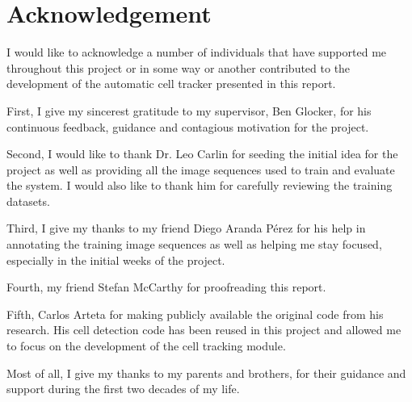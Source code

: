 \chapter*{Acknowledgement}

I would like to acknowledge a number of individuals that have supported me throughout this project or in some way or another contributed to the development of the automatic cell tracker presented in this report.

First, I give my sincerest gratitude to my supervisor, Ben Glocker, for his continuous feedback, guidance and contagious motivation for the project. 

Second, I would like to thank Dr. Leo Carlin for seeding the initial idea for the project as well as providing all the image sequences used to train and evaluate the system. I would also like to thank him for carefully reviewing the training datasets.

Third, I give my thanks to my friend Diego Aranda Pérez for his help in annotating the training image sequences as well as helping me stay focused, especially in the initial weeks of the project.

Fourth, my friend Stefan McCarthy for proofreading this report.

Fifth, Carlos Arteta for making publicly available the original code from his research. His cell detection code has been reused in this project and allowed me to focus on the development of the cell tracking module.

Most of all, I give my thanks to my parents and brothers, for their guidance and support during the first two decades of my life.